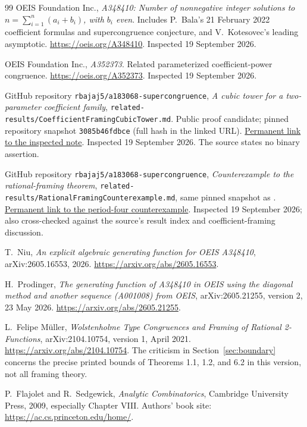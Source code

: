 \documentclass[11pt,a4paper]{article}
\numberwithin{equation}{section}
\theoremstyle{definition}
\theoremstyle{remark}
\begin{document}
\begin{thebibliography}{99}
OEIS Foundation Inc., \emph{A348410: Number of nonnegative integer solutions
to $n=\sum_{i=1}^n(a_i+b_i)$, with $b_i$ even}. Includes P.~Bala's
21 February 2022 coefficient formulas and supercongruence conjecture,
and V.~Kotesovec's leading asymptotic.
\url{https://oeis.org/A348410}. Inspected 19 September 2026.

OEIS Foundation Inc., \emph{A352373}. Related parameterized
coefficient-power congruence.
\url{https://oeis.org/A352373}. Inspected 19 September 2026.

GitHub repository \texttt{rbajaj5/a183068-supercongruence},
\emph{A cubic tower for a two-parameter coefficient family},
\texttt{related-results/CoefficientFramingCubicTower.md}.
Public proof candidate; pinned repository snapshot
\texttt{3085b46fdbce} (full hash in the linked URL).
\href{https://github.com/rbajaj5/a183068-supercongruence/blob/3085b46fdbce945d156d2b5b8b9d1a66627b4375/related-results/CoefficientFramingCubicTower.md}{Permanent link to the inspected note}.
Inspected 19 September 2026. The source states no binary assertion.

GitHub repository \texttt{rbajaj5/a183068-supercongruence},
\emph{Counterexample to the rational-framing theorem},
\texttt{related-results/RationalFramingCounterexample.md}, same pinned
snapshot as \cite{prior}.
\href{https://github.com/rbajaj5/a183068-supercongruence/blob/3085b46fdbce945d156d2b5b8b9d1a66627b4375/related-results/RationalFramingCounterexample.md}{Permanent link to the period-four counterexample}.
Inspected 19 September 2026; also cross-checked against the source's
result index and coefficient-framing discussion.

T.~Niu, \emph{An explicit algebraic generating function for OEIS A348410},
arXiv:2605.16553, 2026.
\url{https://arxiv.org/abs/2605.16553}.

H.~Prodinger, \emph{The generating function of A348410 in OEIS using the
diagonal method and another sequence (A001008) from OEIS},
arXiv:2605.21255, version 2, 23 May 2026.
\url{https://arxiv.org/abs/2605.21255}.

L.~Felipe M\"uller, \emph{Wolstenholme Type Congruences and Framing of Rational
2-Functions}, arXiv:2104.10754, version 1, April 2021.
\url{https://arxiv.org/abs/2104.10754}.
The criticism in Section~\ref{sec:boundary} concerns the precise printed
bounds of Theorems 1.1, 1.2, and 6.2 in this version, not all framing theory.

P.~Flajolet and R.~Sedgewick, \emph{Analytic Combinatorics}, Cambridge
University Press, 2009, especially Chapter VIII.
Authors' book site: \url{https://ac.cs.princeton.edu/home/}.
\end{thebibliography}
\end{document}
